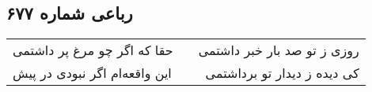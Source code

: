 \begin{center}
\section*{رباعی شماره ۶۷۷}
\label{sec:sh677}
\begin{longtable}{l p{0.5cm} r}
حقا که اگر چو مرغ پر داشتمی
&&
روزی ز تو صد بار خبر داشتمی
\\
این واقعه‌ام اگر نبودی در پیش
&&
کی دیده ز دیدار تو برداشتمی
\\
\end{longtable}
\end{center}
